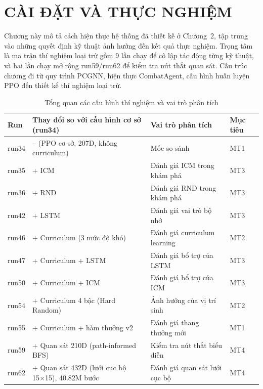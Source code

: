 \clearpage
{}

\setcounter{chapter}{2}
\chapter[CÀI ĐẶT VÀ THỰC NGHIỆM]{CÀI ĐẶT VÀ THỰC NGHIỆM}
Chương này mô tả cách hiện thực hệ thống đã thiết kế ở Chương~2, tập trung vào những quyết định kỹ thuật ảnh hưởng đến kết quả thực nghiệm. Trọng tâm là ma trận thí nghiệm loại trừ gồm 9 lần chạy để cô lập tác động từng kỹ thuật, và hai lần chạy mở rộng run59/run62 để kiểm tra nút thắt quan sát. Cấu trúc chương đi từ quy trình PCGNN, hiện thực CombatAgent, cấu hình huấn luyện PPO đến thiết kế thí nghiệm loại trừ.
\begin{table}[H]
    \centering
    \small
    \caption{Tổng quan các cấu hình thí nghiệm và vai trò phân tích}
    \label{tab:experiment_roadmap}
    \begin{tabular}{|p{1.4cm}|p{4.8cm}|p{4.5cm}|p{3.0cm}|}
        \hline
        \textbf{Run} & \textbf{Thay đổi so với cấu hình cơ sở (run34)} & \textbf{Vai trò phân tích} & \textbf{Mục tiêu} \\
        \hline
        run34 & -- (PPO cơ sở, 207D, không curriculum) & Mốc so sánh & MT1 \\
        \hline
        run35 & + ICM & Đánh giá ICM trong khám phá & MT3 \\
        \hline
        run36 & + RND & Đánh giá RND trong khám phá & MT3 \\
        \hline
        run42 & + LSTM & Đánh giá vai trò bộ nhớ & MT3 \\
        \hline
        run46 & + Curriculum (3 mức độ khó) & Đánh giá curriculum learning & MT2 \\
        \hline
        run47 & + Curriculum + LSTM & Đánh giá bổ trợ của LSTM & MT3 \\
        \hline
        run50 & + Curriculum + ICM & Đánh giá bổ trợ của ICM & MT3 \\
        \hline
        run54 & + Curriculum 4 bậc (Hard Random) & Ảnh hưởng của vị trí sinh & MT2 \\
        \hline
        run55 & + Curriculum + hàm thưởng v2 & Đánh giá thang thưởng mới & MT1 \\
        \hline
        run59 & + Quan sát 210D (path-informed BFS) & Kiểm tra nút thắt biểu diễn & MT4 \\
        \hline
        run62 & + Quan sát 432D (lưới cục bộ 15×15), 40.82M bước & Đánh giá quan sát lưới cục bộ & MT4 \\
        \hline
    \end{tabular}
\end{table}

